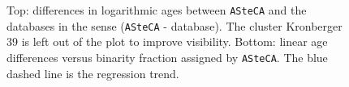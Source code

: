 \documentclass[draft]{aa}
\begin{document}
  \begin{figure}
   \caption{Top: differences in logarithmic ages between \texttt{ASteCA} and
   the databases in the sense (\texttt{ASteCA} - database). The cluster
   Kronberger 39 is left out of the plot to improve visibility.
   Bottom: linear age differences versus binarity fraction assigned by
   \texttt{ASteCA}. The blue dashed line is the regression trend.}
   \label{fig:ages}
  \end{figure}

\end{document}
